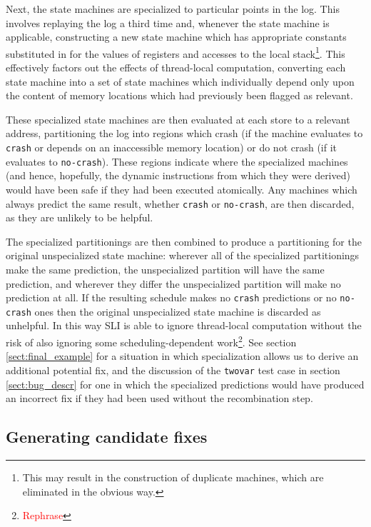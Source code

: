 \documentclass[10pt,twocolumn,preprint,natbib,authoryear]{sigplanconf}
\newcommand{\editorial}[1]{\textcolor{red}{\footnote{\textcolor{red}{#1}}}}
\begin{document}
Next, the state machines are specialized to particular points in the
log.  This involves replaying the log a third time and, whenever the
state machine is applicable, constructing a new state machine which
has appropriate constants substituted in for the values of registers
and accesses to the local stack\footnote{This may result in the
  construction of duplicate machines, which are eliminated in the
  obvious way.}.  This effectively factors out the effects of
thread-local computation, converting each state machine into a set of
state machines which individually depend only upon the content of
memory locations which had previously been flagged as relevant.

These specialized state machines are then evaluated at each store to a
relevant address, partitioning the log into regions which crash (if
the machine evaluates to \verb|crash| or depends on an inaccessible
memory location) or do not crash (if it evaluates to \verb|no-crash|).
These regions indicate where the specialized machines (and hence,
hopefully, the dynamic instructions from which they were derived)
would have been safe if they had been executed atomically.  Any
machines which always predict the same result, whether \verb|crash| or
\verb|no-crash|, are then discarded, as they are unlikely to be
helpful.

The specialized partitionings are then combined to produce a
partitioning for the original unspecialized state machine: wherever
all of the specialized partitionings make the same prediction, the
unspecialized partition will have the same prediction, and wherever
they differ the unspecialized partition will make no prediction at
all.  If the resulting schedule makes no \verb|crash| predictions or
no \verb|no-crash| ones then the original unspecialized state machine
is discarded as unhelpful.  In this way SLI is able to ignore
thread-local computation without the risk of also ignoring some
scheduling-dependent work\editorial{Rephrase}.  See section
\ref{sect:final_example} for a situation in which specialization
allows us to derive an additional potential fix, and the discussion of
the \verb|twovar| test case in section \ref{sect:bug_descr} for one in
which the specialized predictions would have produced an incorrect fix
if they had been used without the recombination step.

\subsection{Generating candidate fixes}
\label{sect:gen_fix}
\end{document}
